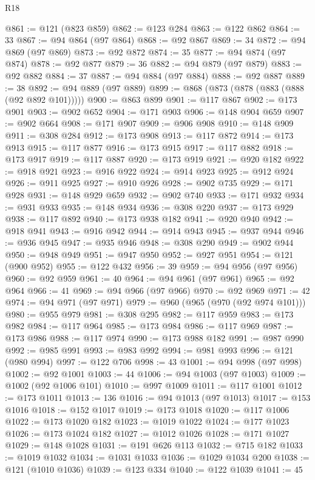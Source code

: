 \begin{lexlean}{R18}
\begin{coremodule}
@861 := @121 (@823 @859)
@862 := @123 @284
@863 := @122 @862
@864 := 33
@867 := @94 @864 (@97 @864)
@868 := @92 @867
@869 := 34
@872 := @94 @869 (@97 @869)
@873 := @92 @872
@874 := 35
@877 := @94 @874 (@97 @874)
@878 := @92 @877
@879 := 36
@882 := @94 @879 (@97 @879)
@883 := @92 @882
@884 := 37
@887 := @94 @884 (@97 @884)
@888 := @92 @887
@889 := 38
@892 := @94 @889 (@97 @889)
@899 := @868 (@873 (@878 (@883 (@888 (@92 @892 @101)))))
@900 := @863 @899
@901 := @117 @867
@902 := @173 @901
@903 := @902 @652
@904 := @171 @903
@906 := @148 @904 @659
@907 := @902 @664
@908 := @171 @907
@909 := @906 @908
@910 := @148 @909
@911 := @308 @284
@912 := @173 @908
@913 := @117 @872
@914 := @173 @913
@915 := @117 @877
@916 := @173 @915
@917 := @117 @882
@918 := @173 @917
@919 := @117 @887
@920 := @173 @919
@921 := @920 @182
@922 := @918 @921
@923 := @916 @922
@924 := @914 @923
@925 := @912 @924
@926 := @911 @925
@927 := @910 @926
@928 := @902 @735
@929 := @171 @928
@931 := @148 @929 @659
@932 := @902 @740
@933 := @171 @932
@934 := @931 @933
@935 := @148 @934
@936 := @308 @220
@937 := @173 @929
@938 := @117 @892
@940 := @173 @938 @182
@941 := @920 @940
@942 := @918 @941
@943 := @916 @942
@944 := @914 @943
@945 := @937 @944
@946 := @936 @945
@947 := @935 @946
@948 := @308 @290
@949 := @902 @944
@950 := @948 @949
@951 := @947 @950
@952 := @927 @951
@954 := @121 (@900 @952)
@955 := @122 @432
@956 := 39
@959 := @94 @956 (@97 @956)
@960 := @92 @959
@961 := 40
@964 := @94 @961 (@97 @961)
@965 := @92 @964
@966 := 41
@969 := @94 @966 (@97 @966)
@970 := @92 @969
@971 := 42
@974 := @94 @971 (@97 @971)
@979 := @960 (@965 (@970 (@92 @974 @101)))
@980 := @955 @979
@981 := @308 @295
@982 := @117 @959
@983 := @173 @982
@984 := @117 @964
@985 := @173 @984
@986 := @117 @969
@987 := @173 @986
@988 := @117 @974
@990 := @173 @988 @182
@991 := @987 @990
@992 := @985 @991
@993 := @983 @992
@994 := @981 @993
@996 := @121 (@980 @994)
@997 := @122 @706
@998 := 43
@1001 := @94 @998 (@97 @998)
@1002 := @92 @1001
@1003 := 44
@1006 := @94 @1003 (@97 @1003)
@1009 := @1002 (@92 @1006 @101)
@1010 := @997 @1009
@1011 := @117 @1001
@1012 := @173 @1011
@1013 := 136
@1016 := @94 @1013 (@97 @1013)
@1017 := @153 @1016
@1018 := @152 @1017
@1019 := @173 @1018
@1020 := @117 @1006
@1022 := @173 @1020 @182
@1023 := @1019 @1022
@1024 := @177 @1023
@1026 := @173 @1024 @182
@1027 := @1012 @1026
@1028 := @171 @1027
@1029 := @148 @1028
@1031 := @191 @626 @113
@1032 := @715 @182
@1033 := @1019 @1032
@1034 := @1031 @1033
@1036 := @1029 @1034 @200
@1038 := @121 (@1010 @1036)
@1039 := @123 @334
@1040 := @122 @1039
@1041 := 45

\end{coremodule}
\end{lexlean}
